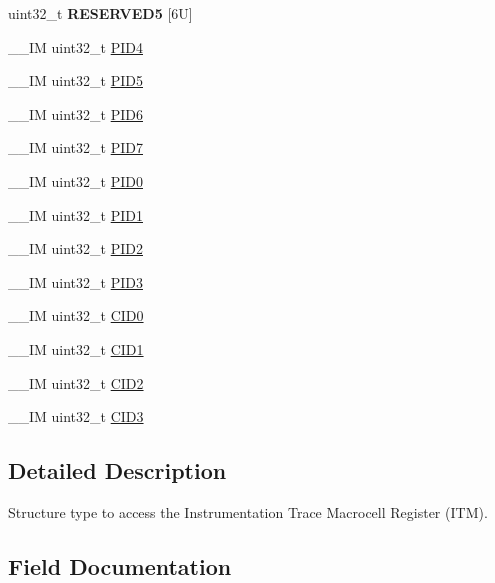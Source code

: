 \begin{DoxyCompactItemize}
uint32\+\_\+t {\bfseries R\+E\+S\+E\+R\+V\+E\+D5} \mbox{[}6\+U\mbox{]}
\item 
\+\_\+\+\_\+\+IM uint32\+\_\+t \mbox{\hyperlink{structITM__Type_aad5e11dd4baf6d941bd6c7450f60a158}{P\+I\+D4}}
\item 
\+\_\+\+\_\+\+IM uint32\+\_\+t \mbox{\hyperlink{structITM__Type_af9085648bf18f69b5f9d1136d45e1d37}{P\+I\+D5}}
\item 
\+\_\+\+\_\+\+IM uint32\+\_\+t \mbox{\hyperlink{structITM__Type_ad34dbe6b1072c77d36281049c8b169f6}{P\+I\+D6}}
\item 
\+\_\+\+\_\+\+IM uint32\+\_\+t \mbox{\hyperlink{structITM__Type_a2bcec6803f28f30d5baf5e20e3517d3d}{P\+I\+D7}}
\item 
\+\_\+\+\_\+\+IM uint32\+\_\+t \mbox{\hyperlink{structITM__Type_ab4a4cc97ad658e9c46cf17490daffb8a}{P\+I\+D0}}
\item 
\+\_\+\+\_\+\+IM uint32\+\_\+t \mbox{\hyperlink{structITM__Type_a89ea1d805a668d6589b22d8e678eb6a4}{P\+I\+D1}}
\item 
\+\_\+\+\_\+\+IM uint32\+\_\+t \mbox{\hyperlink{structITM__Type_a8471c4d77b7107cf580587509da69f38}{P\+I\+D2}}
\item 
\+\_\+\+\_\+\+IM uint32\+\_\+t \mbox{\hyperlink{structITM__Type_af317d5e2d946d70e6fb67c02b92cc8a3}{P\+I\+D3}}
\item 
\+\_\+\+\_\+\+IM uint32\+\_\+t \mbox{\hyperlink{structITM__Type_a30bb2b166b1723867da4a708935677ba}{C\+I\+D0}}
\item 
\+\_\+\+\_\+\+IM uint32\+\_\+t \mbox{\hyperlink{structITM__Type_ac40df2c3a6cef02f90b4e82c8204756f}{C\+I\+D1}}
\item 
\+\_\+\+\_\+\+IM uint32\+\_\+t \mbox{\hyperlink{structITM__Type_a8000b92e4e528ae7ac4cb8b8d9f6757d}{C\+I\+D2}}
\item 
\+\_\+\+\_\+\+IM uint32\+\_\+t \mbox{\hyperlink{structITM__Type_a43451f43f514108d9eaed5b017f8d921}{C\+I\+D3}}
\end{DoxyCompactItemize}


\subsection{Detailed Description}
Structure type to access the Instrumentation Trace Macrocell Register (I\+TM). 

\subsection{Field Documentation}
\mbox{\label{structITM__Type_a30bb2b166b1723867da4a708935677ba}} 
